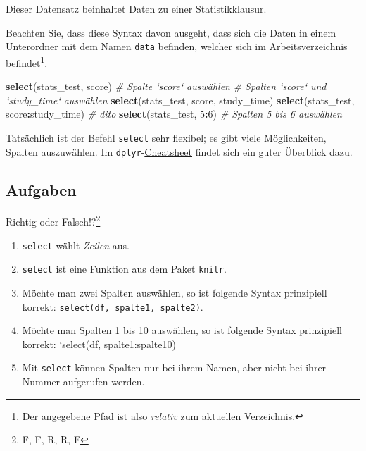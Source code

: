 \documentclass[12pt,ngerman,paper=a4,pagesize,DIV=13]{scrreprt}
\newenvironment{Shaded}{\begin{snugshade}}{\end{snugshade}}
\newcommand{\CommentTok}[1]{\textcolor[rgb]{0.56,0.35,0.01}{\textit{#1}}}
\newcommand{\DecValTok}[1]{\textcolor[rgb]{0.00,0.00,0.81}{#1}}
\newcommand{\KeywordTok}[1]{\textcolor[rgb]{0.13,0.29,0.53}{\textbf{#1}}}
\newcommand{\NormalTok}[1]{#1}
\newcommand{\OperatorTok}[1]{\textcolor[rgb]{0.81,0.36,0.00}{\textbf{#1}}}
\providecommand{\tightlist}{%
  \setlength{\itemsep}{0pt}\setlength{\parskip}{0pt}}
\begin{document}
Dieser Datensatz beinhaltet Daten zu einer Statistikklausur.

Beachten Sie, dass diese Syntax davon ausgeht, dass sich die Daten in
einem Unterordner mit dem Namen \texttt{data} befinden, welcher sich im
Arbeitsverzeichnis befindet\footnote{Der angegebene Pfad ist also
  \emph{relativ} zum aktuellen Verzeichnis.}.

\begin{Shaded}
\begin{Highlighting}[]
\KeywordTok{select}\NormalTok{(stats_test, score)  }\CommentTok{# Spalte `score` auswählen}
\CommentTok{# Spalten `score` und `study_time` auswählen}
\KeywordTok{select}\NormalTok{(stats_test, score, study_time)  }
\KeywordTok{select}\NormalTok{(stats_test, score}\OperatorTok{:}\NormalTok{study_time) }\CommentTok{# dito}
\KeywordTok{select}\NormalTok{(stats_test, }\DecValTok{5}\OperatorTok{:}\DecValTok{6}\NormalTok{) }\CommentTok{# Spalten 5 bis 6 auswählen}
\end{Highlighting}
\end{Shaded}

Tatsächlich ist der Befehl \texttt{select} sehr flexibel; es gibt viele
Möglichkeiten, Spalten auszuwählen. Im
\texttt{dplyr}-\href{https://www.rstudio.com/wp.../data-wrangling-cheatsheet.pdf}{Cheatsheet}
findet sich ein guter Überblick dazu.

\hypertarget{aufgaben-1}{%
\subsection{Aufgaben}\label{aufgaben-1}}

Richtig oder Falsch!?\footnote{F, F, R, R, F}

\begin{enumerate}
\def\labelenumi{\arabic{enumi}.}
\tightlist
\item
  \texttt{select} wählt \emph{Zeilen} aus.
\item
  \texttt{select} ist eine Funktion aus dem Paket \texttt{knitr}.
\item
  Möchte man zwei Spalten auswählen, so ist folgende Syntax prinzipiell
  korrekt: \texttt{select(df,\ spalte1,\ spalte2)}.
\item
  Möchte man Spalten 1 bis 10 auswählen, so ist folgende Syntax
  prinzipiell korrekt: `select(df, spalte1:spalte10)
\item
  Mit \texttt{select} können Spalten nur bei ihrem Namen, aber nicht bei
  ihrer Nummer aufgerufen werden.
\end{enumerate}
\end{document}
